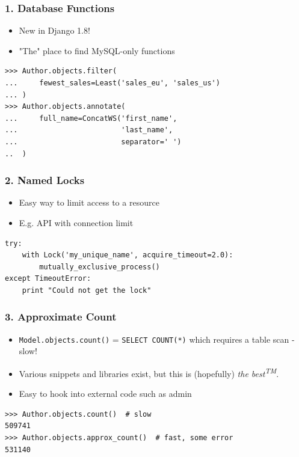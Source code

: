 \documentclass{beamer}
\begin{document}
\begin{frame}[fragile]\frametitle{1. Database Functions}

    \begin{itemize}
        \item New in Django 1.8!
        \item "The" place to find MySQL-only functions
    \end{itemize}


    \begin{lstlisting}
>>> Author.objects.filter(
...     fewest_sales=Least('sales_eu', 'sales_us')
... )
>>> Author.objects.annotate(
...     full_name=ConcatWS('first_name',
...                        'last_name',
...                        separator=' ')
..  )
    \end{lstlisting}

\end{frame}


\begin{frame}[fragile]\frametitle{2. Named Locks}

    \begin{itemize}
        \item Easy way to limit access to a resource
        \item E.g. API with connection limit
    \end{itemize}


    \begin{lstlisting}
try:
    with Lock('my_unique_name', acquire_timeout=2.0):
        mutually_exclusive_process()
except TimeoutError:
    print "Could not get the lock"
    \end{lstlisting}

\end{frame}


\begin{frame}[fragile]\frametitle{3. Approximate Count}

    \begin{itemize}
        \item \texttt{Model.objects.count()} = \texttt{SELECT COUNT(*)}
              which requires a table scan - slow!
        \item Various snippets and libraries exist, but this is (hopefully)
              \textit{the best\textsuperscript{TM}}.
        \item Easy to hook into external code such as admin
    \end{itemize}


    \begin{lstlisting}
>>> Author.objects.count()  # slow
509741
>>> Author.objects.approx_count()  # fast, some error
531140
    \end{lstlisting}

\end{frame}
\end{document}
